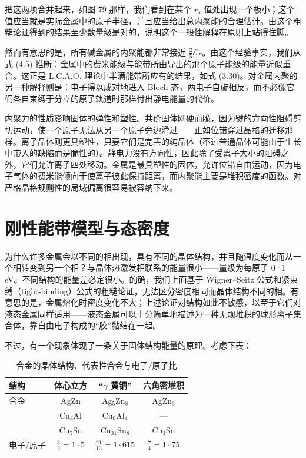 把这两项合并起来，如图 79 那样，我们看到在某个 $r_{s}$ 值处出现一个极小；这个值应当就是实际金属中的原子半径，并且应当给出总内聚能的合理估计。由这个粗糙论证得到的结果至少数量级是对的，说明这个一般性解释在原则上站得住脚。


然而有意思的是，所有碱金属的内聚能都非常接近 $\frac{2}{5}\mathcal{E}_{F}$。由这个经验事实，我们从式 (4.5) 推断：金属中的费米能级与能带所由导出的那个原子能级的能量近似重合。这正是 L.C.A.O. 理论中半满能带所应有的结果，如式 (3.30)。对金属内聚的另一种解释则是：电子得以成对地进入 Bloch 态，两电子自旋相反，而不必像它们各自束缚于分立的原子轨道时那样付出静电能量的代价。

内聚力的性质影响固体的弹性和塑性。共价固体刚硬而脆，因为键的方向性阻碍剪切运动，使一个原子无法从另一个原子旁边滑过——正如位错穿过晶格的迁移那样。离子晶体则更具塑性，只要它们是完善的纯晶体（不过普通晶体可能由于生长中带入的缺陷而是脆性的）。静电力没有方向性，因此除了受离子大小的阻碍之外，它们允许离子四处移动。金属是最具塑性的固体，允许位错自由运动，因为电子气体的费米能倾向于使离子彼此保持距离，而内聚能主要是堆积密度的函数。对严格晶格规则性的局域偏离很容易被容纳下来。

\section{刚性能带模型与态密度}

为什么许多金属会以不同的相出现，具有不同的晶体结构，并且随温度变化而从一个相转变到另一个相？与晶体热激发相联系的能量很小——量级为每原子 0·1 eV。不同结构的能量差必定很小。的确，我们上面基于 Wigner–Seitz 公式和紧束缚（tight-binding）公式的粗糙论证，无法区分密度相同而晶体结构不同的相。有意思的是，金属熔化时密度变化不大；上述论证对结构如此不敏感，以至于它们对液态金属同样适用——液态金属可以十分简单地描述为一种无规堆积的球形离子集合体，靠自由电子构成的“胶”黏结在一起。

不过，有一个现象体现了一条关于固体结构能量的原理。考虑下表：

\begin{table}[H]
\centering
\caption*{合金的晶体结构、代表性合金与电子/原子比}
\begin{tabular}{lccc}
\toprule
结构 & 体心立方 & “$\gamma$ 黄铜” & 六角密堆积 \\
\midrule
合金 & AgZn & Ag$_5$Zn$_8$ & AgZn$_3$ \\
 & Cu$_3$Al & Cu$_9$Al$_4$ & — \\
 & Cu$_5$Sn & Cu$_{31}$Sn$_8$ & Cu$_3$Sn \\
\midrule
电子/原子 & $\frac{3}{2}=1\cdot5$ & $\frac{21}{13}=1\cdot615$ & $\frac{7}{4}=1\cdot75$ \\
\bottomrule
\end{tabular}
\end{table}

